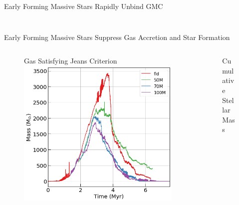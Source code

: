 \documentclass[aspectratio=169]{beamer}
\begin{document}
\begin{frame}{Early Forming Massive Stars Rapidly Unbind GMC}{}
\begin{columns}
\begin{column}{0.45\textwidth}
\begin{figure}[h!]
                \label{fig:ionized}
            \end{figure}
        \end{column}
    \end{columns}
\end{frame} 


\begin{frame}{Early Forming Massive Stars Suppress Gas Accretion and Star Formation}{}
    \begin{columns}
        \begin{column}{0.45\textwidth}
            \begin{figure}[h!]
                Gas Satisfying Jeans Criterion
                \includegraphics[width=\linewidth]{../images/jeans_gas_mass.png} \\
                \label{fig:jeans_mass}
            \end{figure}
        \end{column}
        \begin{column}{0.45\textwidth}
            \begin{figure}[h!]
            	Cumulative Stellar Mass

\end{figure}
\end{column}
\end{columns}
\end{frame}
\end{document}
